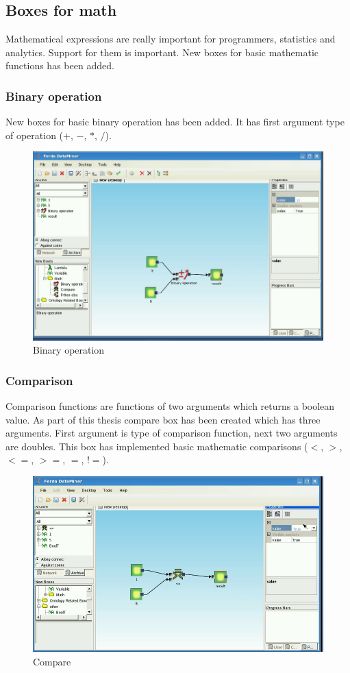 \documentclass[a4paper,12pt]{book}
\begin{document}
\subsection{Boxes for math}
Mathematical expressions are really important for programmers, statistics and analytics. Support for them is important. New boxes for basic mathematic functions has been added. 

\subsubsection{Binary operation}
New boxes for basic binary operation has been added. It has first argument type of operation ($+$, $-$, $*$, $/$).
\begin{figure}
	\includegraphics[width=13.72cm]{binaryOperation2.png}
	\caption{Binary operation}
\end{figure}

\subsubsection{Comparison}
Comparison functions are functions of two arguments which returns a boolean value. As part of this thesis compare box has been created which has three arguments. First argument is type of comparison function, next two arguments are doubles. This box has implemented basic mathematic comparisons ($<$, $>$, $<=$, $>=$, $=$, $!=$).
\begin{figure}
\includegraphics[width=13.72cm]{compare2.png}
	\caption{Compare}
\end{figure}
\end{document}
